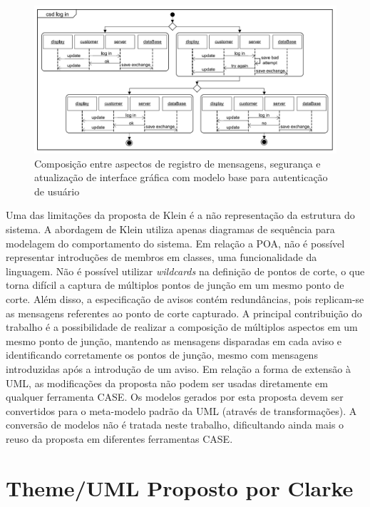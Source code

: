 \begin{figure}
	\centering
	\includegraphics[width=475px]{img/klein_composition.png}
	\caption{Composição entre aspectos de registro de mensagens, segurança e 
	atualização de interface gráfica com modelo
	base para autenticação de usuário}\label{fig:klein_composition}
\end{figure}

Uma das limitações da proposta de Klein é a não representação da estrutura do sistema. A abordagem de Klein utiliza apenas diagramas de sequência para
modelagem do comportamento do sistema. Em relação a POA, não é possível representar introduções de membros em classes, uma funcionalidade da
linguagem. Não é possível utilizar \textit{wildcards} na definição de pontos de corte, o que torna difícil a captura de múltiplos pontos de junção em um mesmo ponto de corte. Além disso, a especificação de avisos contém redundâncias, pois replicam-se as mensagens referentes ao ponto de corte
capturado. A principal contribuição do trabalho é a possibilidade de realizar a composição de múltiplos aspectos em um mesmo ponto de junção, mantendo
as mensagens disparadas em cada aviso e identificando corretamente os pontos de junção, mesmo com mensagens introduzidas após a introdução de um
aviso. Em relação a forma de extensão à UML, as modificações da proposta não podem ser usadas diretamente em qualquer ferramenta CASE. Os modelos
gerados por esta proposta devem ser convertidos para o meta-modelo padrão da UML (através de transformações). A conversão de modelos não é tratada
neste trabalho, dificultando ainda mais o reuso da proposta em diferentes ferramentas CASE.

\section{Theme/UML Proposto por Clarke}

